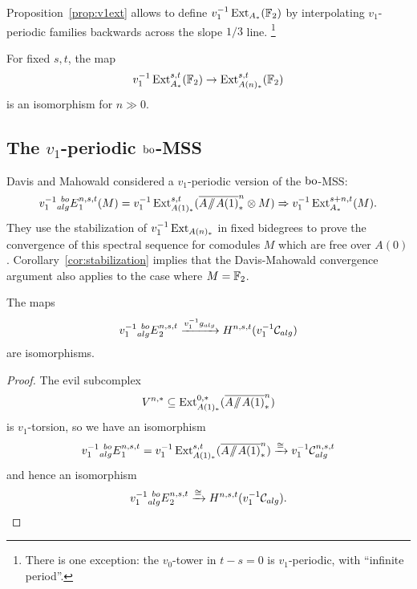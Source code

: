 Proposition~\ref{prop:v1ext} allows to define $v_1^{-1}\operatorname{Ext}_{A_*}(\mathbb{F}_2)$ by interpolating $v_1$-periodic families backwards across the slope $1/3$ line. 
\footnote{There is one exception: the $v_0$-tower in $t-s = 0$ is $v_1$-periodic, with ``infinite period''.}

\begin{cor}\label{cor:stabilization}
For fixed $s,t$, the map
\[ v_1^{-1}\operatorname{Ext}^{s,t}_{A_*}(\mathbb{F}_2) \rightarrow \operatorname{Ext}^{s,t}_{A(n)_*}(\mathbb{F}_2) \]
is an isomorphism for $n \gg 0$.
\end{cor}

\subsection*{The $v_1$-periodic $\mathrm{bo}$-MSS}

Davis and Mahowald \cite{DavisMahowaldv1} considered a $v_1$-periodic version of the $\mathrm{bo}$-MSS:
\[ v_1^{-1} \! \prescript{bo}{alg}{E}_1^{n,s,t}(M) = v_1^{-1} \operatorname{Ext}^{s,t}_{A(1)_*}(\overline{A\! \sslash \! A(1)}^{n}_* \otimes M) \Rightarrow v_1^{-1}\operatorname{Ext}^{s+n,t}_{A_*}(M). \]
They use the stabilization of $v_1^{-1}\operatorname{Ext}_{A(n)_*}$ in fixed bidegrees to prove the convergence of this spectral sequence for comodules $M$ which are free over $A(0)$.  Corollary~\ref{cor:stabilization} implies that the Davis-Mahowald convergence argument also applies to the case where $M = \mathbb{F}_2$.

\begin{lem}\label{lem:v1E2boalg}
The maps
\[
v_1^{-1} \! \prescript{bo}{alg}{E}^{n,s,t}_2 \xrightarrow{v_1^{-1}g_{alg}} H^{n,s,t}(v_1^{-1} \mathcal{C}_{alg})
\]
are isomorphisms.
\end{lem}

\begin{proof}
The evil subcomplex
\[ V^{n,*} \subseteq \operatorname{Ext}^{0,*}_{A(1)_*}(\overline{A\! \sslash \! A(1)}^{n}_*) \]
is $v_1$-torsion, so we have an isomorphism
\[ v_1^{-1} \! \prescript{bo}{alg}{E}_1^{n,s,t} = v_1^{-1} \operatorname{Ext}^{s,t}_{A(1)_*}(\overline{A\! \sslash \! A(1)}^{n}_*) \xrightarrow{\cong} v_1^{-1}\mathcal{C}^{n,s,t}_{alg} \]
and hence an isomorphism
\[ v_1^{-1} \! \prescript{bo}{alg}{E}^{n,s,t}_2 \xrightarrow{\cong}  H^{n,s,t}(v_1^{-1}\mathcal{C}_{alg}). \qedhere \]
\end{proof}

\begin{comment}
\begin{lem}\label{lem:v1HCalg}
The maps
$$ H^{n,s,t}(\mc{C}_{alg}) \rightarrow H^{n,s,t}(v_1^{-1}\mc{C}_{alg}) $$
are injections.
\end{lem}

\begin{proof}
As the patterns $\bo_i[j]^{\bra{k}}$ of Section~\ref{sec:alg} that make up $H^*(\mc{C}_{alg})$ are all $v_1$-periodic, the maps 
$$ H^{n,s,t}(\mc{C}_{alg}) \rightarrow v_1^{-1} H^{n,s,t}(\mc{C}_{alg}) $$
are all injective.  There is one exceptional case to consider: $n = 0$ and $s = t$.  In this case $H^{0,s,s}(\mc{C}_{alg})$ is spanned by $v_0^s$.  However, this $v_0$-tower is easily checked to also be in $H^{0,s,s}(v_1^{-1}\mc{C}_{alg})$.
\end{proof} 
\end{comment}
